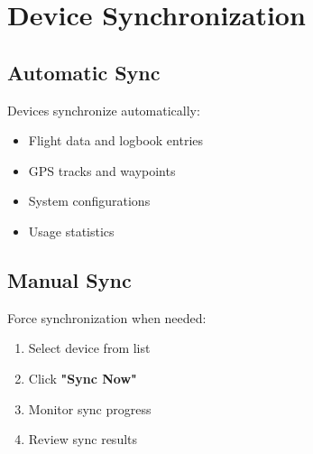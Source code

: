 \section{Device Synchronization}

\subsection{Automatic Sync}

Devices synchronize automatically:
\begin{itemize}
    \item Flight data and logbook entries
    \item GPS tracks and waypoints
    \item System configurations
    \item Usage statistics
\end{itemize}

\subsection{Manual Sync}

Force synchronization when needed:
\begin{enumerate}
    \item Select device from list
    \item Click \textbf{"Sync Now"}
    \item Monitor sync progress
    \item Review sync results
\end{enumerate}
